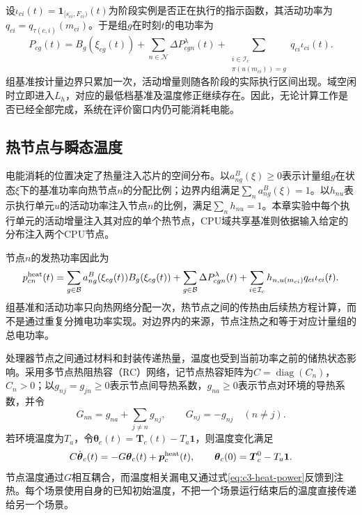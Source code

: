 设$\iota_{ci}(t)=\mathbf1_{[s_{ci},F_{ci})}(t)$为阶段实例是否正在执行的指示函数，其活动功率为$q_{ci}=q_{\tau(c,i)}(m_{ci})$。于是组$g$在时刻$t$的电功率为
\begin{equation}
 P_{cg}(t)=B_g(\xi_{cg}(t))
 +\sum_{n\in\mathcal N}\Delta P^\lambda_{cgn}(t)
 +\sum_{\substack{i\in\mathcal I_c\\\pi(u(m_{ci}))=g}}
       q_{ci}\iota_{ci}(t).
 \label{eq:c3-group-power}
\end{equation}
组基准按计量边界只累加一次，活动增量则随各阶段的实际执行区间出现。域空闲时立即进入$L_h$，对应的最低档基准及温度修正继续存在。因此，无论计算工作是否已经全部完成，系统在评价窗口内仍可能消耗电能。

\subsection{热节点与瞬态温度}

电能消耗的位置决定了热量注入芯片的空间分布。以$a^B_{ng}(\xi)\ge0$表示计量组$g$在状态$\xi$下的基准功率向热节点$n$的分配比例；边界内组满足$\sum_n a^B_{ng}(\xi)=1$。以$h_{nu}$表示执行单元$u$的活动功率注入节点$n$的比例，满足$\sum_n h_{nu}=1$。本章实验中每个执行单元的活动增量注入其对应的单个热节点，CPU域共享基准则依据输入给定的分布注入两个CPU节点。

节点$n$的发热功率因此为
\begin{equation}
 p^{\rm heat}_{cn}(t)=
 \sum_{g\in\mathcal B}a^B_{ng}(\xi_{cg}(t))B_g(\xi_{cg}(t))
 +\sum_{g\in\mathcal B}\Delta P^\lambda_{cgn}(t)
 +\sum_{i\in\mathcal I_c}h_{n,u(m_{ci})}q_{ci}\iota_{ci}(t).
 \label{eq:c3-heat-power}
\end{equation}
组基准和活动功率只向热网络分配一次，热节点之间的传热由后续热方程计算，而不是通过重复分摊电功率实现。对边界内的来源，节点注热之和等于对应计量组的总电功率。

处理器节点之间通过材料和封装传递热量，温度也受到当前功率之前的储热状态影响。采用多节点热阻热容（RC）网络\cite{source1,chantem2011,fdtm2022}，记节点热容矩阵为$C=\operatorname{diag}(C_n)$，$C_n>0$；以$g_{nj}=g_{jn}\ge0$表示节点间导热系数，$g_{na}\ge0$表示节点对环境的导热系数，并令
\begin{equation}
 G_{nn}=g_{na}+\sum_{j\ne n}g_{nj},\qquad
 G_{nj}=-g_{nj}\quad(n\ne j).
 \label{eq:c3-G}
\end{equation}
若环境温度为$T_a$，令$\boldsymbol\theta_c(t)=
\boldsymbol T_c(t)-T_a\mathbf1$，则温度变化满足
\begin{equation}
 C\dot{\boldsymbol\theta}_c(t)=
 -G\boldsymbol\theta_c(t)+\boldsymbol p^{\rm heat}_c(t),
 \qquad
 \boldsymbol\theta_c(0)=\boldsymbol T_c^0-T_a\mathbf1.
 \label{eq:c3-thermal-ode}
\end{equation}
节点温度通过$G$相互耦合，而温度相关漏电又通过式\eqref{eq:c3-heat-power}反馈到注热。每个场景使用自身的已知初始温度，不把一个场景运行结束后的温度直接传递给另一个场景。

